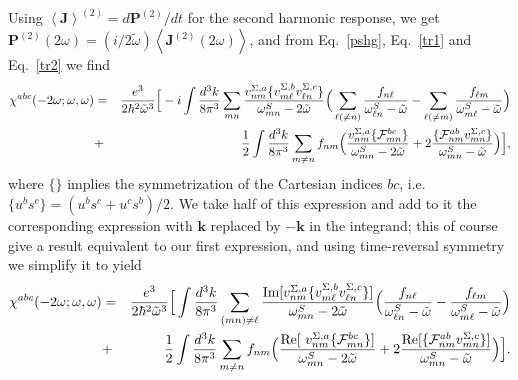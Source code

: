 \documentclass[floatfix,prb,aps,superscriptaddress,11pt]{revtex4}
\begin{document}
Using $\left\langle \mathbf{J}\right\rangle ^{(2)}=d\mathbf{P}^{(2)}/dt$ for the second
harmonic response, we get $\mathbf{P}^{(2)}(2\omega)=(i/2\tilde\omega)\left\langle \mathbf{J}
^{(2)}(2\omega)\right\rangle $, and from Eq.~\eqref{pshg}, Eq.~\eqref{tr1} and
Eq.~\eqref{tr2} we find 
\begin{eqnarray*}
\chi ^{abc}(-2\omega;\omega,\omega) &=&\frac{e^{3}}{2\hbar ^{2}\tilde\omega^{3}}\Big[-i\int 
\frac{d^{3}k}{8\pi ^{3}}\sum_{mn}\frac{v_{nm}^{\Sigma ,a}\{v_{m\ell
}^{\Sigma ,b}v_{\ell n}^{\Sigma ,c}\}}{\omega_{mn}^{S}-2\tilde\omega}
\Big(
\sum_{\ell(\neq n)}
\frac{f_{n\ell }}{\omega_{\ell n}^{S}-\tilde\omega}
-
\sum_{\ell(\neq m)}
\frac{f_{\ell m}}{\omega_{m\ell }^{S}-\tilde\omega}
\Big)  
\notag  \label{chi2tot} \\
&+&\frac{1}{2}\int \frac{d^{3}k}{8\pi ^{3}}\sum_{m\neq n}f_{nm}\Big(\frac{
v_{nm}^{\Sigma ,a}\{\mathcal{F}_{mn}^{bc}\}}{\omega_{mn}^{S}-2\tilde\omega}+2\frac{\{
\mathcal{F}_{nm}^{ab}v_{mn}^{\Sigma ,c}\}}{\omega_{mn}^{S}-\tilde\omega}\Big)\Big],
\end{eqnarray*}
where $\{\}$ implies the symmetrization of the Cartesian indices $bc$, i.e. $
\{u^{b}s^{c}\}=(u^{b}s^{c}+u^{c}s^{b})/2$. We take half of this expression
and add to it the corresponding expression with $\mathbf{k}$ replaced by $-
\mathbf{k}$ in the integrand; this of course give a result equivalent to our first
expression, and using time-reversal symmetry we simplify it to yield 
\begin{eqnarray}
\chi ^{abc}(-2\omega;\omega,\omega) &=&\frac{e^{3}}{2\hbar ^{2}\tilde\omega^{3}}\Big[\int 
\frac{d^{3}k}{8\pi ^{3}}\sum_{(mn)\neq\ell }\frac{\mbox{Im}\lbrack v_{nm}^{\Sigma
,a}\{v_{m\ell }^{\Sigma ,b}v_{\ell n}^{\Sigma ,c}\}]}{\omega_{mn}^{S}-2\tilde\omega}
\Big(\frac{f_{n\ell }}{\omega_{\ell n}^{S}-\tilde\omega}-\frac{f_{\ell m}}{\omega_{m\ell
}^{S}-\tilde\omega}\Big)  \notag  \label{chi2tot2} \\
&+&\frac{1}{2}\int \frac{d^{3}k}{8\pi ^{3}}\sum_{m\neq n}f_{nm}\Big(\frac{
\mbox{Re}\lbrack \ v_{nm}^{\Sigma ,a}\{\mathcal{F}_{mn}^{bc}\}]}{\omega
_{mn}^{S}-2\tilde\omega}+2\frac{\mbox{Re}\lbrack \{\mathcal{F}_{nm}^{ab}v_{mn}^{
\Sigma ,c}\}]}{\omega_{mn}^{S}-\tilde\omega}\Big)\Big].
\end{eqnarray}
\end{document}
